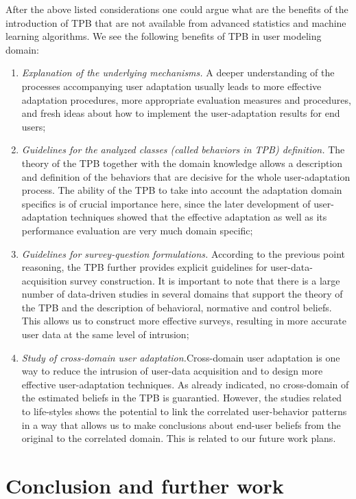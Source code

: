 \documentclass{llncs}
\begin{document}
\vspace{0.6em}
 After the above listed considerations one could argue what are the benefits of the introduction of TPB that are not available from advanced statistics and machine learning algorithms. We see the following benefits of TPB in user modeling domain:
\begin{enumerate}
 \item {\it Explanation of the underlying mechanisms.} A deeper understanding of the processes accompanying user adaptation usually leads to more effective adaptation procedures, more appropriate evaluation measures and procedures, and fresh ideas about how to implement the user-adaptation results for end users; 
 \item {\it Guidelines for the analyzed classes (called behaviors in TPB) definition.} The theory of the TPB together with the domain knowledge allows a description and definition of the behaviors that are decisive for the whole user-adaptation process. The ability of the TPB to take into account the adaptation domain specifics is of crucial importance here, since the later development of user-adaptation techniques showed that the effective adaptation as well as its performance evaluation are very much domain specific; 
 \item {\it Guidelines for survey-question formulations.} According to the previous point reasoning, the TPB further provides explicit guidelines for user-data-acquisition survey construction. It is important to note that there is a large number of data-driven studies in several domains that support the theory of the TPB and the description of behavioral, normative and control beliefs. This allows us to construct more effective surveys, resulting in more accurate user data at the same level of intrusion;  
 \item {\it Study of cross-domain user adaptation.}Cross-domain user adaptation is one way to reduce the intrusion of user-data acquisition and to design more effective user-adaptation techniques. As already indicated, no cross-domain of the estimated beliefs in the TPB is guarantied. However, the studies related to life-styles shows the potential to link the correlated user-behavior patterns in a way that allows us to make conclusions about end-user beliefs from the original to the correlated domain. This is related to our future work plans.
\end{enumerate}

\section{Conclusion and further work}\label{Sec_ConcAndFW}
\end{document}
